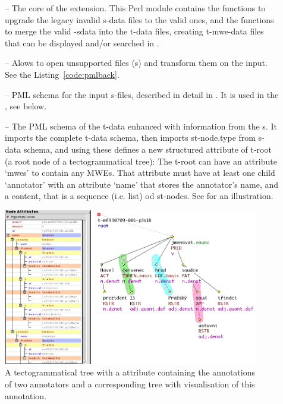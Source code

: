 \begin{description}
\item [] -- The core of the extension. This Perl module contains the functions to upgrade the legacy invalid s-data files to the valid ones, and the functions to merge the valid -sdata into the t-data files, creating t-mwe-data files that can be displayed and/or searched in \tred.

\item [] -- Alows to open unsupported files (\stf{}s) and transform them on the input. See the Listing~\ref{code:pmlback}.

\item [] -- PML schema for the input s-files, described in detail in . It is used in the , see below. 

\item [\label{item:t-mwe-schema}] -- The PML schema of the t-data enhanced with information from the \sf{}s. It imports the complete t-data schema, then imports st-node.type from s-data schema, and using these defines a new structured attribute of t-root (a root node of a tectogrammatical tree): The t-root can have an attribute `mwes' to contain any MWEs. That attribute must have at least one child `annotator' with an attribute `name' that stores the annotator's name, and a content, that is a sequence (i.e. list) od st-nodes. See  for an illustration.

\end{description}

\begin{figure}[htbp]
   \centering
   \includegraphics[width=\textwidth]{images/mwes-attr-in-tred}
   \caption{A tectogrammatical tree with a  attribute containing the annotations of two annotators and a corresponding tree with visualisation of this annotation.}
   \label{fig:mwes-at-t-root}
\end{figure}

